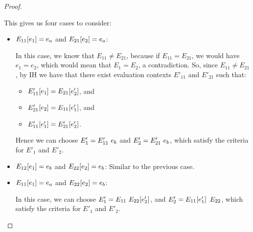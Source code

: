 \begin{proof}
\begin{itemize}
      This gives us four cases to consider:

      \begin{itemize}
        \item $E_{11}\hspace{-0.5mm}\left[e_1\right] = e_a$ and
          $E_{21}\hspace{-0.5mm}\left[e_2\right] = e_a$:

          In this case, we know that $E_{11} \neq E_{21}$, because if
          $E_{11} = E_{21}$, we would have $e_1 = e_2$, which would
          mean that $E_1 = E_2$, a contradiction.  So, since $E_{11}
          \neq E_{21}$, by IH we have that there exist evaluation
          contexts $E'_{11}$ and $E'_{21}$ such that:
          \begin{itemize}
          \item $E'_{11}\hspace{-0.5mm}\left[e_1\right] = E_{21}\hspace{-0.5mm}\left[e'_2\right]$, and
          \item $E'_{21}\hspace{-0.5mm}\left[e_2\right] = E_{11}\hspace{-0.5mm}\left[e'_1\right]$, and
          \item $E'_{11}\hspace{-0.5mm}\left[e'_1\right] = E'_{21}\hspace{-0.5mm}\left[e'_2\right]$.
          \end{itemize}

          Hence we can choose $E'_1 =
          E'_{11}~e_b$ and $E'_2 =
          E'_{21}~e_b$, which satisfy the
          criteria for $E'_1$ and $E'_2$.


        \item $E_{12}\hspace{-0.5mm}\left[e_1\right] = e_b$ and
          $E_{22}\hspace{-0.5mm}\left[e_2\right] = e_b$: Similar to the previous
          case.
          
        \item $E_{11}\hspace{-0.5mm}\left[e_1\right] = e_a$ and
          $E_{22}\hspace{-0.5mm}\left[e_2\right] = e_b$:

          In this case, we can choose $E'_1 =
          E_{11}~E_{22}\hspace{-0.5mm}\left[e'_2\right]$, and $E'_2 =
          E_{11}\hspace{-0.5mm}\left[e'_1\right]~E_{22}$, which satisfy the
          criteria for $E'_1$ and $E'_2$.


\end{itemize}
\end{itemize}
\end{proof}
